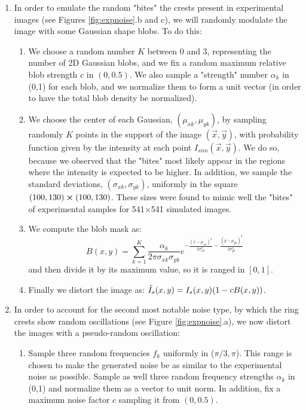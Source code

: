 \documentclass[11pt, a4paper, twoside]{article} %
\begin{document}
\begin{enumerate}
\item In order to emulate the random "bites" the crests present in experimental images (see Figures \ref{fig:expnoise}.b and c), we will randomly modulate the image with some Gaussian shape blobs. To do this:
\begin{enumerate}
\item We choose a random number $K$ between 0 and 3, representing the number of 2D Gaussian blobs, and we fix a random maximum relative blob strength $c$ in $(0,0.5)$. We also sample a "strength" number $\alpha_k$ in (0,1) for each blob, and we normalize them to form a unit vector (in order to have the total blob density be normalized).
\item We choose the center of each Gaussian, $(\mu_{xk},\mu_{yk})$, by sampling randomly $K$ points in the support of the image $(\vec{x},\vec{y})$, with probability function given by the intensity at each point $I_{sim}(\vec{x},	\vec{y})$. We do so, because we observed that the "bites" most likely appear in the regions where the intensity is expected to be higher. In addition, we sample the standard deviations, $(\sigma_{xk},\sigma_{yk})$, uniformly in the square $(100,130)\cross(100,130)$. These sizes were found to mimic well the "bites" of experimental samples for 541$\times$541 simulated images.
\item We compute the blob mask as:\vspace{-0.2cm}
\begin{equation}
B(x,y)=\sum_{k=1}^K \frac{\alpha_k}{2\pi\sigma_{xk}\sigma_{yk}}e^{-\frac{(x-\mu_{xk})^2}{2\sigma_{xk}^2}-\frac{(y-\mu_{yk})^2}{2\sigma_{yk}^2}}
\end{equation}
and then divide it by its maximum value, so it is ranged in $[0,1]$.
\item Finally we distort the image as: $
\tilde{I}_s(x,y)=I_s(x,y)\qty(1-cB(x,y))$.
\end{enumerate}
\item In order to account for the second most notable noise type, by which the ring crests show random oscillations (see Figure \ref{fig:expnoise}.a), we now distort the images with a pseudo-random oscillation:
\begin{enumerate}
\item Sample three random frequencies $f_k$ uniformly in ($\pi/3,\pi$). This range is chosen to make the generated noise be as similar to the experimental noise as possible. Sample as well three random frequency strengths $\alpha_k$ in (0,1) and normalize them as a vector to unit norm. In addition, fix a maximum noise factor $c$ sampling it from $(0,0.5)$.

\end{enumerate}
\end{enumerate}
\end{document}
